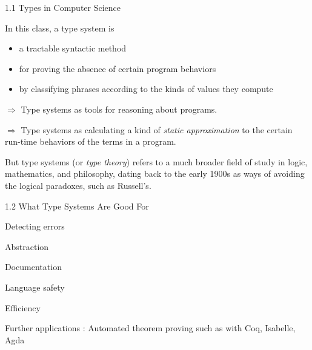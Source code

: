 \documentclass[table]{beamer}
\begin{document}
\begin{frame}[t]{1.1 Types in Computer Science} \vspace{10pt}

In this class, a type system is 
\begin{itemize}
\item a tractable syntactic method
\item for proving the absence of certain program behaviors 
\item by classifying phrases according to the kinds of values they compute
\end{itemize}

 \vspace{10pt}
 
 $\Rightarrow$ Type systems as tools for reasoning about programs.
 \vspace{5pt}
 
  $\Rightarrow$ Type systems as calculating a kind of {\it static approximation} to the certain {run-time behaviors of the terms}  in a program.
  
 \vspace{10pt}
 
 But type systems (or {\it type theory}) refers to a much broader field of study in logic, mathematics, and philosophy, dating back to the early 1900s as ways of avoiding the logical paradoxes, such as Russell's. 
 
\end{frame}

\begin{frame}[t]{1.2 What Type Systems Are Good For} \vspace{10pt}

Detecting errors

\vspace{10pt}

Abstraction

\vspace{10pt}

Documentation

\vspace{10pt}

Language safety

\vspace{10pt}

Efficiency

\vspace{10pt}

Further applications : Automated theorem proving such as with Coq, Isabelle, Agda
\end{frame}
\end{document}

